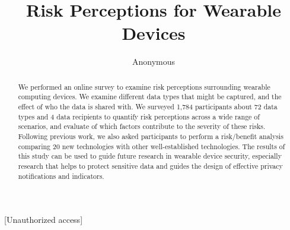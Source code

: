 \documentclass{acm_proc_article-sp}
\begin{document}
\title{Risk Perceptions for Wearable Devices}






\author{
 \alignauthor Anonymous\\
   \vspace{0.5em}
}

\maketitle

\begin{abstract}
We performed an online survey to examine risk perceptions surrounding wearable computing devices. We examine different data types that might be captured,  and the effect of who the data is shared with. We surveyed 1,784 participants about 72 data types and 4 data recipients to quantify risk perceptions across a wide range of scenarios, and evaluate of which factors contribute to the severity of these risks. Following previous work, we also asked participants to perform a risk/benefit analysis comparing 20 new technologies with other well-established technologies. The results of this study can be used to guide future research in wearable device security, especially research that helps to protect sensitive data and guides the design of effective privacy notifications and indicators.
\end{abstract}

[Unauthorized access]
\end{document}

